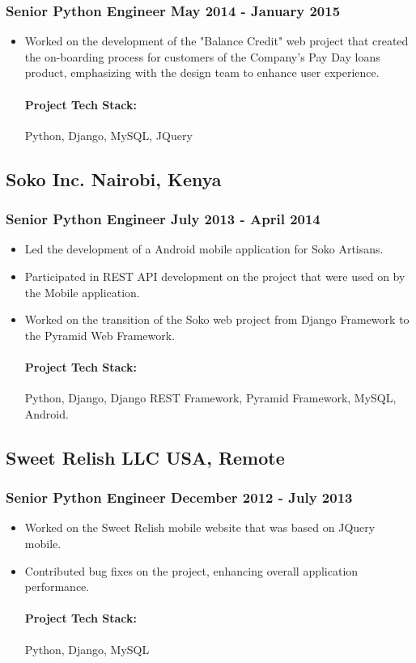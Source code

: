\documentclass[11pt]{article} %
\begin{document}
\subsubsection{Senior Python Engineer \hfill  May 2014 - January 2015}
\begin{itemize}
    \item Worked on the development of the "Balance Credit" web project that created the on-boarding process for customers of the Company's Pay Day loans product, emphasizing with the design team to enhance user experience.

    \paragraph{Project Tech Stack:} Python, Django, MySQL, JQuery
\end{itemize}

\subsection{Soko Inc. \hfill Nairobi, Kenya}
\subsubsection{Senior Python Engineer \hfill  July 2013 - April 2014}
\begin{itemize}
    \item Led the development of a Android mobile application for Soko Artisans.
    \item Participated in REST API development on the project that were used on by the Mobile application.
    \item Worked on the transition of the Soko web project from Django Framework to the Pyramid Web Framework.

    \paragraph{Project Tech Stack:} Python, Django, Django REST Framework, Pyramid Framework, MySQL, Android.
\end{itemize}

\subsection{Sweet Relish LLC \hfill USA, Remote}
\subsubsection{Senior Python Engineer \hfill  December 2012 - July 2013}
\begin{itemize}
    \item Worked on the Sweet Relish mobile website that was based on JQuery mobile.
    \item Contributed bug fixes on the project, enhancing overall application performance.

    \paragraph{Project Tech Stack:} Python, Django, MySQL
\end{itemize}
\end{document}
